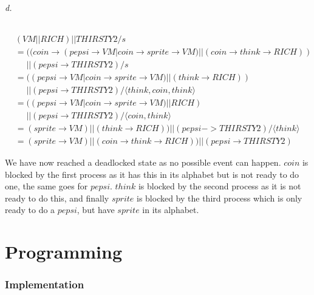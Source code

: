 \documentclass[a4paper, 11pt]{article}
\begin{document}

\paragraph{d.} %
\label{par:d_}

\begin{align*}
&(VM || RICH) || THIRSTY2 / s \\
&= 
((coin \rightarrow (pepsi \rightarrow VM | coin \rightarrow sprite \rightarrow VM) || (coin \rightarrow think \rightarrow RICH)) \\
&\phantom{=} || (pepsi \rightarrow THIRSTY2) / s \\
&= ((pepsi \rightarrow VM | coin \rightarrow sprite \rightarrow VM) || (think \rightarrow RICH)) \\
&\phantom{=} || (pepsi \rightarrow THIRSTY2) / \langle think, coin, think \rangle \\
&= ((pepsi \rightarrow VM | coin \rightarrow sprite \rightarrow VM) || RICH) \\
&\phantom{=} || (pepsi \rightarrow THIRSTY2) / \langle coin, think \rangle \\
&= (sprite \rightarrow VM) || (think \rightarrow RICH)) || (pepsi -> THIRSTY2) / \langle think \rangle \\
&= (sprite \rightarrow VM) || (coin \rightarrow think \rightarrow RICH)) || (pepsi \rightarrow THIRSTY2)
\end{align*}

We have now reached a deadlocked state as no possible event can happen. $coin$ is blocked by the first process as it has this in its alphabet but is not ready to do one, the same goes for $pepsi$. $think$ is blocked by the second process as it is not ready to do this, and finally $sprite$ is blocked by the third process which is only ready to do a $pepsi$, but have $sprite$ in its alphabet.




\part{Programming} %
\label{prt:programming_}

\section{Implementation} %
\label{sec:implementation}
\end{document}
